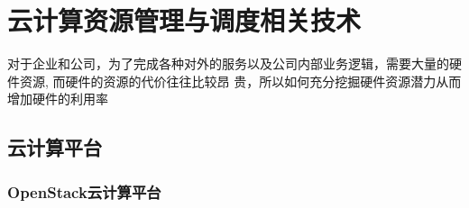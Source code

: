 
\chapter{云计算资源管理与调度相关技术}
\label{chap:outline}

对于企业和公司，为了完成各种对外的服务以及公司内部业务逻辑，需要大量的硬件资源, 而硬件的资源的代价往往比较昂
贵，所以如何充分挖掘硬件资源潜力从而增加硬件的利用率

\section{云计算平台}
\subsection{OpenStack云计算平台}

